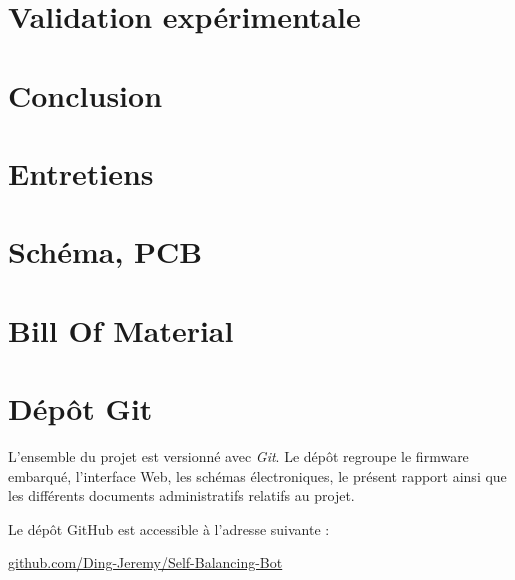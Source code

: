 \documentclass[
    iai, %
    eem, %
]{heig-tb}
\begin{document}
\chapter{Validation expérimentale} 

\chapter{Conclusion} 


\clearpage
\printbibliography
 
\appendix
\appendixpage
\addappheadtotoc
\chapter{Entretiens}



\chapter{Schéma, PCB}
\label{annexe:schema_electrique}








\chapter{Bill Of Material}

\label{annexe:bom}


\chapter{Dépôt Git}
\label{annexe:git}
L'ensemble du projet est versionné avec \textit{Git}. Le dépôt regroupe le firmware embarqué, l'interface Web, les schémas électroniques, le présent rapport ainsi que les différents documents administratifs relatifs au projet.

Le dépôt GitHub est accessible à l'adresse suivante :

\begin{center}
\href{https://github.com/Ding-Jeremy/Self-Balancing-Bot}{github.com/Ding-Jeremy/Self-Balancing-Bot}
\end{center}

\let\cleardoublepage\clearpage
\backmatter

\label{glossaire}
\glsaddall[types=main]
\printglossary
\label{index}
\printindex
\end{document}
